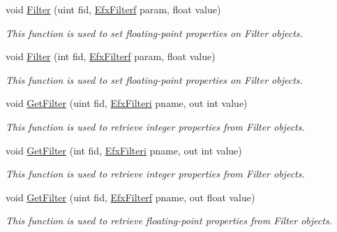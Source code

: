 \begin{DoxyCompactItemize}
void \hyperlink{class_open_t_k_1_1_audio_1_1_open_a_l_1_1_effects_extension_ac925fabeba566c7497ba28b8db5c86ac}{Filter} (uint fid, \hyperlink{namespace_open_t_k_1_1_audio_1_1_open_a_l_a6a389aa5e465025fe4eb3fba1603fd6b}{Efx\-Filterf} param, float value)
\begin{DoxyCompactList}\small\item\em This function is used to set floating-\/point properties on Filter objects.\end{DoxyCompactList}\item 
void \hyperlink{class_open_t_k_1_1_audio_1_1_open_a_l_1_1_effects_extension_ad3386bcd4e31173f058b44c73a08ae99}{Filter} (int fid, \hyperlink{namespace_open_t_k_1_1_audio_1_1_open_a_l_a6a389aa5e465025fe4eb3fba1603fd6b}{Efx\-Filterf} param, float value)
\begin{DoxyCompactList}\small\item\em This function is used to set floating-\/point properties on Filter objects.\end{DoxyCompactList}\item 
void \hyperlink{class_open_t_k_1_1_audio_1_1_open_a_l_1_1_effects_extension_a35d8cc9ccd8b34f5cf52a74203456fdb}{Get\-Filter} (uint fid, \hyperlink{namespace_open_t_k_1_1_audio_1_1_open_a_l_a071c0527689a9645ced24caee8e0f542}{Efx\-Filteri} pname, out int value)
\begin{DoxyCompactList}\small\item\em This function is used to retrieve integer properties from Filter objects.\end{DoxyCompactList}\item 
void \hyperlink{class_open_t_k_1_1_audio_1_1_open_a_l_1_1_effects_extension_a5a91a48507abf811dcf3b3c8ce7b45bc}{Get\-Filter} (int fid, \hyperlink{namespace_open_t_k_1_1_audio_1_1_open_a_l_a071c0527689a9645ced24caee8e0f542}{Efx\-Filteri} pname, out int value)
\begin{DoxyCompactList}\small\item\em This function is used to retrieve integer properties from Filter objects.\end{DoxyCompactList}\item 
void \hyperlink{class_open_t_k_1_1_audio_1_1_open_a_l_1_1_effects_extension_af07e454cc706218448e219c90529b659}{Get\-Filter} (uint fid, \hyperlink{namespace_open_t_k_1_1_audio_1_1_open_a_l_a6a389aa5e465025fe4eb3fba1603fd6b}{Efx\-Filterf} pname, out float value)
\begin{DoxyCompactList}\small\item\em This function is used to retrieve floating-\/point properties from Filter objects.\end{DoxyCompactList}\item 

\end{DoxyCompactItemize}

